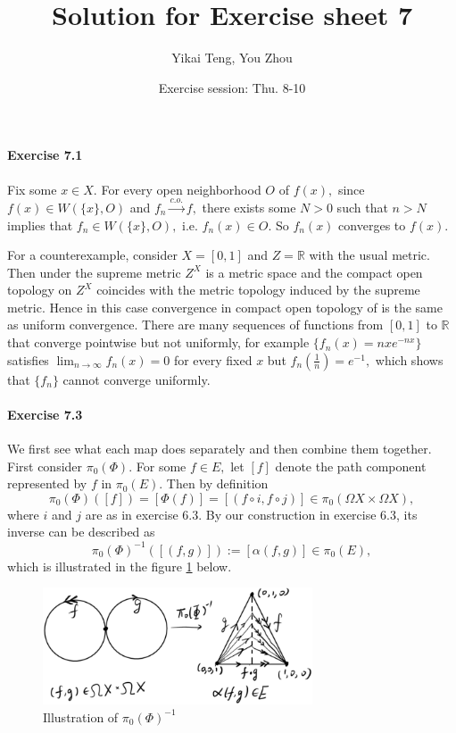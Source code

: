 \documentclass{article}
\title{Solution for Exercise sheet 7}
\author{Yikai Teng, You Zhou}
\date{Exercise session: Thu. 8-10}
\begin{document}
\maketitle
\paragraph{Exercise 7.1}Fix some $x\in X.$ For every open neighborhood $O$ of $f(x),$ since $f(x)\in W(\{x\},O)$ and $f_n\stackrel{c.o.}\rightarrow f,$ there exists some $N>0$ such that $n>N$ implies that $f_n\in W(\{x\},O),$ i.e. $f_n(x)\in O.$ So $f_n(x)$ converges to $f(x).$

For a counterexample, consider $X=[0,1]$ and $Z=\mathbb{R}$ with the usual metric. Then under the supreme metric $Z^X$ is a metric space and the compact open topology on $Z^X$ coincides with the metric topology induced by the supreme metric. Hence in this case convergence in compact open topology of is the same as uniform convergence. There are many sequences of functions from $[0,1]$ to $\mathbb{R}$ that converge pointwise but not uniformly, for example $\{f_n(x)=nxe^{-nx}\}$ satisfies $\lim_{n\rightarrow\infty}f_n(x)=0$ for every fixed $x$ but $f_n(\frac{1}{n})=e^{-1},$ which shows that $\{f_n\}$ cannot converge uniformly.

\paragraph{Exercise 7.3}
We first see what each map does separately and then combine them together. First consider $\pi_0(\Phi).$ For some $f\in E,$ let $[f]$ denote the path component represented by $f$ in $\pi_0(E).$ Then by definition
\[\pi_0(\Phi)([f])=[\Phi(f)]=[(f\circ i,f\circ j)]\in\pi_0(\Omega X\times\Omega X),\]
where $i$ and $j$ are as in exercise 6.3. By our construction in exercise 6.3, its inverse can be described as
\[\pi_0(\Phi)^{-1}([(f,g)]):=[\alpha(f,g)]\in\pi_0(E),\]
which is illustrated in the figure \ref{7.3_1} below.
\begin{figure}[ht]
  \centering
  \includegraphics[width=8cm]{7.3_1.png}
  \caption{Illustration of $\pi_0(\Phi)^{-1}$}\label{7.3_1}
\end{figure}
\end{document}
